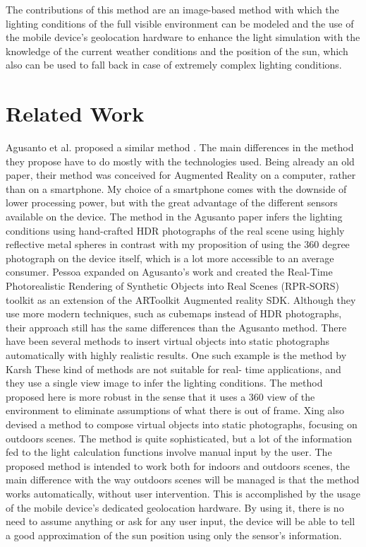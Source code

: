 \documentclass{article}
\begin{document}
The contributions of this method are an image-based method with which the lighting conditions of the full visible environment can be modeled and the use of the mobile device's geolocation hardware to enhance the light simulation with the knowledge of the current weather conditions and the position of the sun, which also can be used to fall back in case of extremely complex lighting conditions.

\section{Related Work}
Agusanto et al. proposed a similar method \cite{agusanto2003}. The main differences in the method they propose have to do mostly with the technologies used. Being already an old paper, their method was conceived for Augmented Reality on a computer, rather than on a smartphone. My choice of a smartphone comes with the downside of lower processing power, but with the great advantage of the different sensors available on the device. The method in the Agusanto paper infers the lighting conditions using hand-crafted HDR photographs of the real scene using highly reflective metal spheres in contrast with my proposition of using the 360 degree photograph on the device itself, which is a lot more accessible to an average consumer.\newline
Pessoa\cite{pessoa2011} expanded on Agusanto's work and created the Real-Time Photorealistic Rendering of Synthetic Objects into Real Scenes (RPR-SORS) toolkit as an extension of the ARToolkit Augmented reality SDK. Although they use more modern techniques, such as cubemaps instead of HDR photographs, their approach still has the same differences than the Agusanto method.\newline
There have been several methods to insert virtual objects into static photographs automatically with highly realistic results. One such example is the method by Karsh \cite{karsh2014} These kind of methods are not suitable for real- time applications, and they use a single view image to infer the lighting conditions. The method proposed here is more robust in the sense that it uses a 360 view of the environment to eliminate assumptions of what there is out of frame.\newline
Xing\cite{xing2013} also devised a method to compose virtual objects into static photographs, focusing on outdoors scenes. The method is quite sophisticated, but a lot of the information fed to the light calculation functions involve manual input by the user. The proposed method is intended to work both for indoors and outdoors scenes, the main difference with the way outdoors scenes will be managed is that the method works automatically, without user intervention. This is accomplished by the usage of the mobile device's dedicated geolocation hardware. By using it, there is no need to assume anything or ask for any user input, the device will be able to tell a good approximation of the sun position using only the sensor's information.
\end{document}
